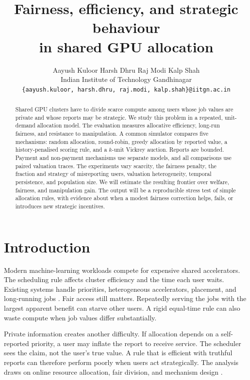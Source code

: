 \documentclass{article}
\title{Fairness, efficiency, and strategic behaviour\\in shared GPU allocation}
\author{
  Aayush Kuloor \quad Harsh Dhru \quad Raj Modi \quad Kalp Shah \\
  Indian Institute of Technology Gandhinagar \\
  \texttt{\{aayush.kuloor, harsh.dhru, raj.modi, kalp.shah\}@iitgn.ac.in}
}
\begin{document}
\maketitle

\begin{abstract}
Shared GPU clusters have to divide scarce compute among users whose job values
are private and whose reports may be strategic. We study this problem in a
repeated, unit-demand allocation model. The evaluation measures allocative
efficiency, long-run fairness, and resistance to manipulation. A common
simulator compares five mechanisms: random allocation, round-robin, greedy
allocation by reported value, a history-penalised scoring rule, and a $k$-unit
Vickrey auction. Reports are bounded. Payment and non-payment mechanisms use
separate models, and all comparisons use paired valuation traces. The
experiments vary scarcity, the fairness penalty, the fraction and strategy of
misreporting users, valuation heterogeneity, temporal persistence, and
population size. We will estimate the resulting frontier over welfare,
fairness, and manipulation gain. The output will be a reproducible stress test
of simple allocation rules, with evidence about when a modest fairness
correction helps, fails, or introduces new strategic incentives.
\end{abstract}


\section{Introduction}
\label{sec:intro}

Modern machine-learning workloads compete for expensive shared accelerators.
The scheduling rule affects cluster efficiency and the time each user waits.
Existing systems handle priorities, heterogeneous accelerators, placement, and
long-running jobs \cite{gu2019tiresias,narayanan2020heterogeneity}. Fair access
still matters. Repeatedly serving the jobs with the largest apparent benefit
can starve other users. A rigid equal-time rule can also waste compute when job
values differ substantially.

Private information creates another difficulty. If allocation depends on a
self-reported priority, a user may inflate the report to receive service. The
scheduler sees the claim, not the user's true value. A rule that is efficient
with truthful reports can therefore perform poorly when users act
strategically. The analysis draws on online resource allocation, fair division,
and mechanism design
\cite{nisan2007algorithmic,ghodsi2011dominant,bertsimas2011price}.
\end{document}
